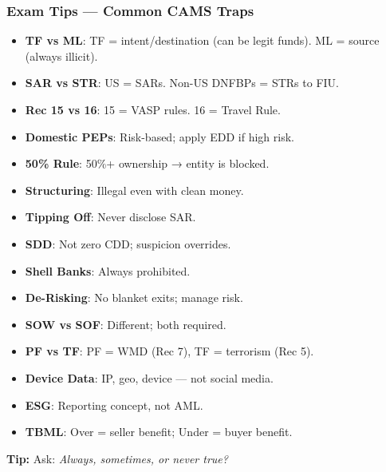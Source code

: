 \documentclass[12pt,aspectratio=169]{beamer}
\renewcommand{\small}{\fontsize{7}{8}\selectfont}
\begin{document}
\begin{frame}
	\frametitle{\textbf{Exam Tips — Common CAMS Traps}}
	
	\small
	\begin{itemize}
		\item \textbf{TF vs ML}: TF = intent/destination (can be legit funds). ML = source (always illicit).
		\item \textbf{SAR vs STR}: US = SARs. Non-US DNFBPs = STRs to FIU.
		\item \textbf{Rec 15 vs 16}: 15 = VASP rules. 16 = Travel Rule.
		\item \textbf{Domestic PEPs}: Risk-based; apply EDD if high risk.
		\item \textbf{50\% Rule}: 50\%+ ownership → entity is blocked.
		\item \textbf{Structuring}: Illegal even with clean money.
		\item \textbf{Tipping Off}: Never disclose SAR.
		\item \textbf{SDD}: Not zero CDD; suspicion overrides.
		\item \textbf{Shell Banks}: Always prohibited.
		\item \textbf{De-Risking}: No blanket exits; manage risk.
		\item \textbf{SOW vs SOF}: Different; both required.
		\item \textbf{PF vs TF}: PF = WMD (Rec 7), TF = terrorism (Rec 5).
		\item \textbf{Device Data}: IP, geo, device — not social media.
		\item \textbf{ESG}: Reporting concept, not AML.
		\item \textbf{TBML}: Over = seller benefit; Under = buyer benefit.
	\end{itemize}
	
	\vspace{0.2cm}
	\textbf{Tip:} Ask: \textit{Always, sometimes, or never true?}
\end{frame}
	
\end{document}
